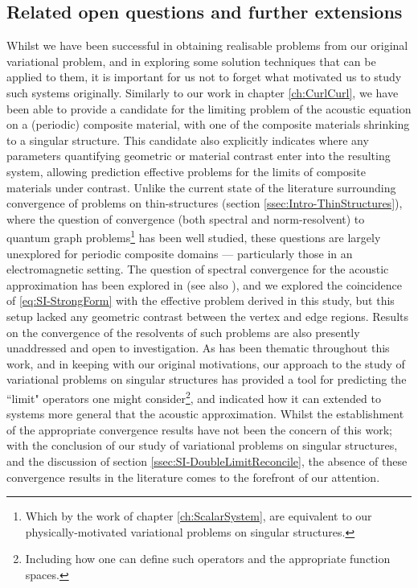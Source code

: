 \subsection{Related open questions and further extensions}
Whilst we have been successful in obtaining realisable problems from our original variational problem, and in exploring some solution techniques that can be applied to them, it is important for us not to forget what motivated us to study such systems originally.
Similarly to our work in chapter \ref{ch:CurlCurl}, we have been able to provide a candidate for the limiting problem of the acoustic equation on a (periodic) composite material, with one of the composite materials shrinking to a singular structure.
This candidate also explicitly indicates where any parameters quantifying geometric or material contrast enter into the resulting system, allowing prediction effective problems for the limits of composite materials under contrast.
Unlike the current state of the literature surrounding convergence of problems on thin-structures (section \ref{ssec:Intro-ThinStructures}), where the question of convergence (both spectral and norm-resolvent) to quantum graph problems\footnote{Which by the work of chapter \ref{ch:ScalarSystem}, are equivalent to our physically-motivated variational problems on singular structures.} has been well studied, these questions are largely unexplored for periodic composite domains --- particularly those in an electromagnetic setting.
The question of spectral convergence for the acoustic approximation has been explored in \cite{figotin1998spectral} (see also \cite[section 7.5]{kuchment2001mathematics}), and we explored the coincidence of \eqref{eq:SI-StrongForm} with the effective problem derived in this study, but this setup lacked any geometric contrast between the vertex and edge regions.
Results on the convergence of the resolvents of such problems are also presently unaddressed and open to investigation.
As has been thematic throughout this work, and in keeping with our original motivations, our approach to the study of variational problems on singular structures has provided a tool for predicting the ``limit" operators one might consider\footnote{Including how one can define such operators and the appropriate function spaces.}, and indicated how it can extended to systems more general that the acoustic approximation.
Whilst the establishment of the appropriate convergence results have not been the concern of this work; with the conclusion of our study of variational problems on singular structures, and the discussion of section \ref{ssec:SI-DoubleLimitReconcile}, the absence of these convergence results in the literature comes to the forefront of our attention.

